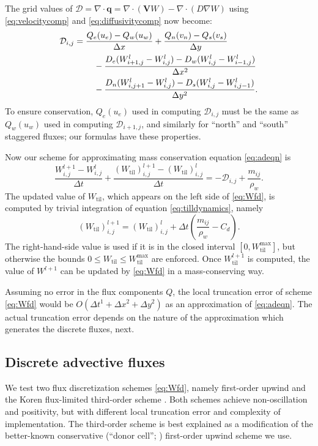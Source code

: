 \documentclass[gmd]{copernicus}   %
\newcommand{\text}{\textrm}
\newcommand\bV{\mathbf{V}}
\newcommand\bq{\mathbf{q}}
\newcommand{\Div}{\nabla\cdot}
\newcommand{\grad}{\nabla}
\newcommand{\Wtil}{W_{\text{til}}}
\newcommand{\Wtilmax}{W_{\text{til}}^{\text{max}}}
\newcommand{\Wlij}{W^l_{i,j}}
\begin{document}
The grid values of $\mathcal{D} = \Div \bq = \Div (\bV W) - \Div (D \grad W)$ using \eqref{eq:velocitycomp} and \eqref{eq:diffusivitycomp} now become:
\begin{align}
&\mathcal{D}_{i,j} =  \frac{Q_e(u_e) - Q_w(u_w)}{\Delta x} + \frac{Q_n(v_n) - Q_s(v_s)}{\Delta y}  \label{eq:fluxdivgrid} \\
&\qquad \qquad - \frac{D_e (W_{i+1,j}^l - \Wlij) - D_w (\Wlij - W_{i-1,j}^l)}{\Delta x^2} \notag \\
&\qquad \qquad - \frac{D_n (W_{i,j+1}^l - \Wlij) - D_s (\Wlij - W_{i,j-1}^l)}{\Delta y^2}.  \notag
\end{align}
To ensure conservation, $Q_e(u_e)$ used in computing $\mathcal{D}_{i,j}$ must be the same as $Q_w(u_w)$ used in computing $\mathcal{D}_{i+1,j}$, and similarly for ``north'' and ``south'' staggered fluxes; our formulas have these properties.

Now our scheme for approximating mass conservation equation \eqref{eq:adeqn} is
\begin{equation}
\frac{W_{i,j}^{l+1} - W_{i,j}^l}{\Delta t} + \frac{(\Wtil)_{i,j}^{l+1} - (\Wtil)_{i,j}^l}{\Delta t} = - \mathcal{D}_{i,j} + \frac{m_{ij}}{\rho_w}.    \label{eq:Wfd}
\end{equation}
The updated value of $\Wtil$, which appears on the left side of \eqref{eq:Wfd}, is computed by trivial integration of equation \eqref{eq:tilldynamics}, namely
\begin{equation}
(\Wtil)_{i,j}^{l+1} = (\Wtil)_{i,j}^l + \Delta t \left(\frac{m_{ij}}{\rho_w} - C_d\right).  \label{eq:tillupdatefd}
\end{equation}
The right-hand-side value is used if it is in the closed interval $[0,\Wtilmax]$, but otherwise the bounds $0\le \Wtil \le \Wtilmax$ are enforced.  Once $\Wtil^{l+1}$ is computed, the value of $W^{l+1}$ can be updated by \eqref{eq:Wfd} in a mass-conserving way.

Assuming no error in the flux components $Q$, the local truncation error \citep{MortonMayers} of scheme \eqref{eq:Wfd} would be $O(\Delta t^1 + \Delta x^2 + \Delta y^2)$ as an approximation of \eqref{eq:adeqn}.  The actual truncation error depends on the nature of the approximation which generates the discrete fluxes, next.

\subsection{Discrete advective fluxes}  \label{subsect:discretefluxes}  We test two flux discretization schemes \eqref{eq:Wfd}, namely first-order upwind and the Koren flux-limited third-order scheme \citep{HundsdorferVerwer2010}.  Both schemes achieve non-oscillation and positivity, but with different local truncation error and complexity of implementation.  The third-order scheme is best explained as a modification of the better-known conservative (``donor cell''; \cite{LeVeque}) first-order upwind scheme we use.
\end{document}
